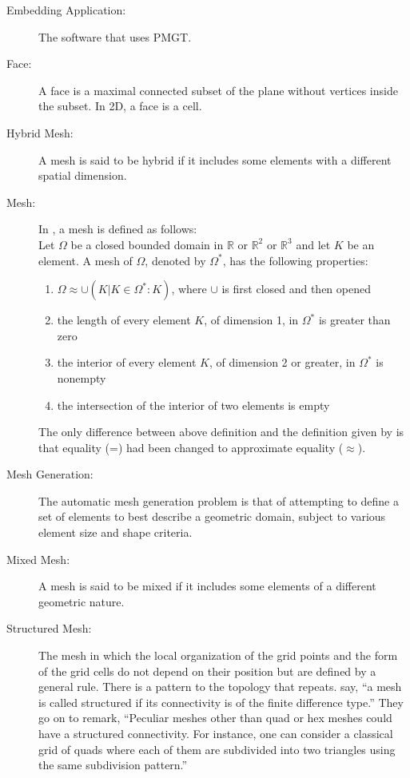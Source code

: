 \documentclass[12pt,titlepage]{article}
\begin{document}
\begin{description}
\item [Embedding Application:] The software that uses PMGT.

\item [Face:] A face is a maximal connected subset of the plane without vertices inside the subset. In 2D, a face is a cell.\citep{FreyAndGeorge2000}

\item [Hybrid Mesh:] A mesh is said to be hybrid if it includes some elements with a different spatial dimension. \citep{FreyAndGeorge2000}

\item[Mesh:] \label{def_mesh}
In \citet{Smith2004}, a mesh is defined as follows:\\
Let $\Omega$ be a closed bounded domain in $\mathbb{R}$ or $\mathbb{R}^2$ or $\mathbb{R}^3$
and let $K$ be an element.  A mesh of $\Omega$, denoted by $\Omega^{*}$, has the following properties:
\begin{enumerate}
\item $\Omega \approx \cup(K | K \in \Omega^{*} : K)$, where $\cup$ is first closed and then opened
\item the length of every element $K$, of dimension 1, in $\Omega^{*}$ is greater than zero
\item the interior of every element $K$, of dimension 2 or greater, in $\Omega^{*}$ is nonempty
\item the intersection of the interior of two elements is empty
\end{enumerate}
The only difference between above definition and the definition given by \citet{FreyAndGeorge2000} is that equality (=) had been changed to approximate equality ($\approx$).

\item [Mesh Generation:] The automatic mesh generation problem is that of attempting to define a set of elements to best describe a geometric domain, subject to various element size and shape criteria. \citep{Smith2004}

\item [Mixed Mesh:] A mesh is said to be mixed if it includes some elements of a different geometric nature. \citep{FreyAndGeorge2000}

\item [Structured Mesh:] The mesh in which the local organization of the grid points and the form of the grid cells do not depend on their position but are defined by a general rule.  There is a pattern to the topology that repeats. 
\citet{FreyAndGeorge2000} say, ``a mesh is called structured if its connectivity is of the finite difference type.'' 
They go on to remark, ``Peculiar meshes other than quad or hex meshes could have a structured connectivity.  For
instance, one can consider a classical grid of quads where each of them are subdivided into two triangles using the same
subdivision pattern.''


\end{description}
\end{document}
